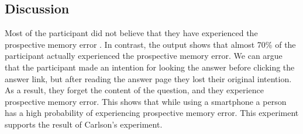 \subsection{Discussion}

Most of the participant did not believe that they have experienced the prospective memory error
. In contrast, the output shows that  almost 70\% of the participant actually experienced the prospective memory error.
We can argue that the participant made an intention for looking the answer before clicking the answer link, but after reading the answer page
they lost their original intention.
As a result, they forget the content of the question, and they experience prospective memory error.
This shows that while using a smartphone a person has a high probability of experiencing prospective memory error.
This experiment supports the result of Carlson's experiment.



